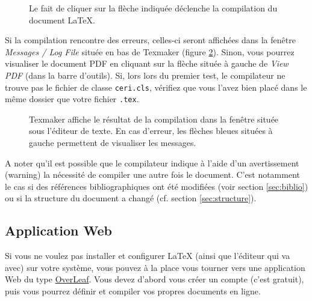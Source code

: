 \documentclass{ceri}
\begin{document}
\begin{figure}[htb]
	\centering
	\caption{Le fait de cliquer sur la flèche indiquée déclenche la compilation du document \LaTeX{}.}
	\label{fig:compilation}
\end{figure}

Si la compilation rencontre des erreurs, celles-ci seront affichées dans la fen\^etre \textit{Messages / Log File} située en bas de Texmaker (figure \ref{fig:log}). Sinon, vous pourrez visualiser le document PDF en cliquant sur la flèche située à gauche de \textit{View PDF} (dans la barre d'outils). Si, lors lors du premier test, le compilateur ne trouve pas le fichier de classe \texttt{ceri.cls}, vérifiez que vous l'avez bien placé dans le même dossier que votre fichier \texttt{.tex}.

\begin{figure}[htb]
	\centering
	\caption{Texmaker affiche le résultat de la compilation dans la fen\^etre située sous l'éditeur de texte. En cas d'erreur, les flèches bleues situées à gauche permettent de visualiser les messages.}
	\label{fig:log}
\end{figure}

A noter qu'il est possible que le compilateur indique à l'aide d'un avertissement (warning) la nécessité de compiler une autre fois le document. C'est notamment le cas si des références bibliographiques ont été modifiées (voir section \ref{sec:biblio}) ou si la structure du document a changé (cf\@. section \ref{sec:structure}).

\subsection{Application Web}
Si vous ne voulez pas installer et configurer \LaTeX{} (ainsi que l'éditeur qui va avec) sur votre système, vous pouvez à la place vous tourner vers une application Web du type \href{https://www.overleaf.com/signup?ref=d62cb1694be6}{OverLeaf}. Vous devez d'abord vous créer un compte (c'est gratuit), puis vous pourrez définir et compiler vos propres documents en ligne. 
\end{document}
